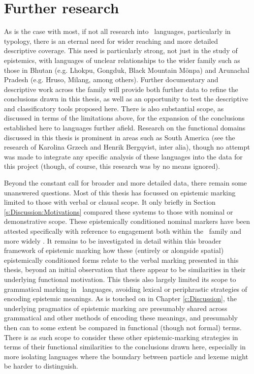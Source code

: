 \section{Further research}
As is the case with most, if not all research into \lfam\ languages, particularly in typology, there is an eternal need for wider reaching and more detailed descriptive coverage. This need is particularly strong, not just in the study of epistemics, with languages of unclear relationships to the wider family such as those in Bhutan (e.g. Lhokpu, Gongduk, Black Mountain Mönpa) and Arunachal Pradesh (e.g. Hruso, Milang, among others). Further documentary and descriptive work across the family will provide both further data to refine the conclusions drawn in this thesis, as well as an opportunity to test the descriptive and classificatory tools proposed here. There is also substantial scope, as discussed in terms of the limitations above, for the expansion of the conclusions established here to languages further afield. Research on the functional domains discussed in this thesis is prominent in areas such as South America (see the research of Karolina Grzech and Henrik Bergqvist, inter alia), though no attempt was made to integrate any specific analysis of these languages into the data for this project (though, of course, this research was by no means ignored).

Beyond the constant call for broader and more detailed data, there remain some unanswered questions. Most of this thesis has focussed on epistemic marking limited to those with verbal or clausal scope. It only briefly in Section \ref{s:Discussion:Motivations} compared these systems to those with nominal or demonstrative scope. These epistemically conditioned nominal markers have been attested specifically with reference to engagement both within the \lfam\ family \cite{GonzalezPerez2022} and more widely \cites{EvansBergqvistSanRoque2018a}{EvansBergqvistSanRoque2018b}. It remains to be investigated in detail within this broader framework of epistemic marking how these (entirely or alongside spatial) epistemically conditioned forms relate to the verbal marking presented in this thesis, beyond an initial observation that there appear to be similarities in their underlying functional motivation. This thesis also largely limited its scope to grammatical marking in \lfam\ languages, avoiding lexical or periphrastic strategies of encoding epistemic meanings. As is touched on in Chapter \ref{c:Discussion}, the underlying pragmatics of epistemic marking are presumably shared across grammatical and other methods of encoding these meanings, and presumably then can to some extent be compared in functional (though not formal) terms. There is as such scope to consider these other epistemic-marking strategies in terms of their functional similarities to the conclusions drawn here, especially in more isolating languages where the boundary between particle and lexeme might be harder to distinguish.